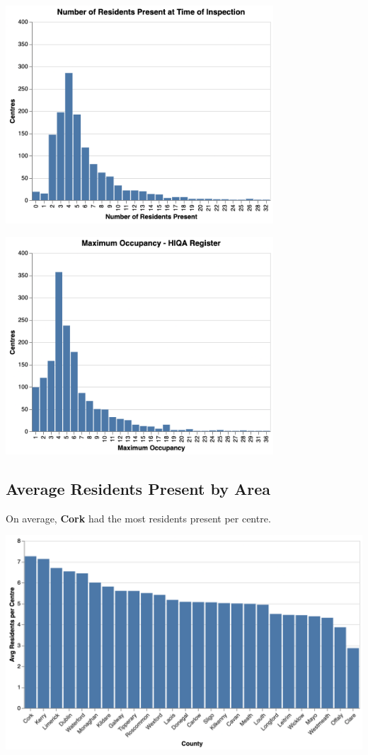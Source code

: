 \documentclass[a4paper,11pt,twoside]{article}
\begin{document}
\begin{center}
\includegraphics[width=10cm]{img/03_no_residents_dist.png}
\end{center}
\begin{center}
\includegraphics[width=10cm]{img/04_max_occupancy_dist.png}
\end{center}
\subsection{Average Residents Present by Area}
\label{sec:org1945225}

On average, \textbf{Cork} had the most residents present per centre.

\begin{center}
\includegraphics[width=.9\linewidth]{img/06_01_avg_res_per_centre.png}
\end{center}
\end{document}
